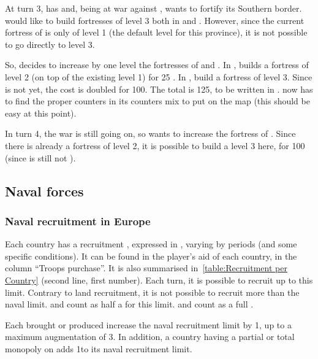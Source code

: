 \begin{exemple}
  At turn 3, \FRA has \TREN and, being at war against \HIS, wants to fortify
  its Southern border. \FRA would like to build fortresses of level 3 both in
  \provinceBearn and \provinceLanguedoc. However, since the current fortress
  of \provinceLanguedoc is only of level 1 (the default level for this
  province), it is not possible to go directly to level 3.

  So, \FRA decides to increase by one level the fortresses of \provinceBearn
  and \provinceLanguedoc. In \provinceLanguedoc, \FRA builds a fortress of
  level 2 (on top of the existing level 1) for 25 \ducats. In \provinceBearn,
  \FRA build a fortress of level 3. Since \FRA is not \TARQ yet, the cost is
  doubled for 100\ducats. The total is 125\ducats, to be written in
  . \FRA now has to find the proper counters in
  its counters mix to put on the map (this should be easy at this point).

  In turn 4, the war is still going on, so \FRA wants to increase the fortress
  of \provinceLanguedoc. Since there is already a fortress of level 2, it is
  possible to build a level 3 here, for 100 \ducats (since \FRA is still not
  \TARQ).
\end{exemple}

\subsection{Naval forces}\label{chExpenses:Naval Purchase}
\subsubsection{Naval recruitment in Europe}
\aparag[Limit]
\bparag Each country has a recruitment , expressed in \ND,
varying by periods (and some specific conditions).
\bparag It can be found in the player's aid of each country, in the column
``Troops purchase''.
\bparag It is also summarised in~\ref{table:Recruitment per Country} (second
line, first number).
\bparag Each turn, it is possible to recruit up to this limit. Contrary to
land recruitment, it is not possible to recruit more than the naval
limit.
\bparag \NGD and \NDE count as half a \ND for this limit. \NTD and \VGD count
as a full \ND.

\label{chExpenses:Effect of Wood Purchase}
\label{chExpenses:Effect of Fish Monopoly Purchase}
\bparag Each  brought or produced increase the naval recruitment
limit by 1\ND, up to a maximum augmentation of 3\ND.
\bparag In addition, a country having a partial or total monopoly on
 adds 1\ND to its naval recruitment limit.

